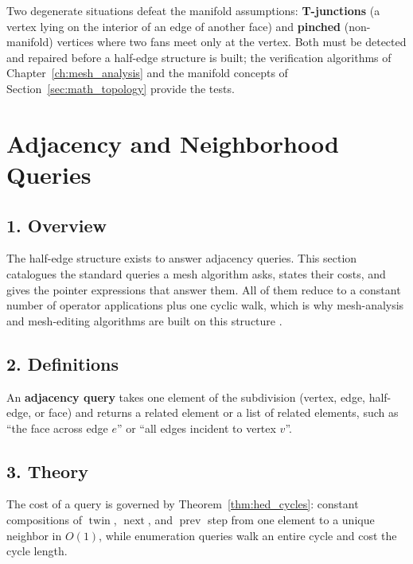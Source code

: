 \begin{remark}
Two degenerate situations defeat the manifold assumptions:
\textbf{T-junctions} (a vertex lying on the interior of
an edge of another face) and \textbf{pinched}
(non-manifold) vertices where two fans meet only at the vertex. Both must
be detected and repaired before a half-edge structure is built; the
verification algorithms of Chapter~\ref{ch:mesh_analysis} and the
manifold concepts of Section~\ref{sec:math_topology} provide the tests.
\end{remark}


\section{Adjacency and Neighborhood Queries}
\label{sec:halfedge_adjacency}

\subsection{1. Overview}

The half-edge structure exists to answer adjacency
queries. This section catalogues the standard queries a mesh algorithm
asks, states their costs, and gives the pointer expressions that answer
them. All of them reduce to a constant number of operator applications plus
one cyclic walk, which is why mesh-analysis and mesh-editing algorithms are
built on this structure \cite{deberg2008,botsch2010}.

\subsection{2. Definitions}

\begin{definition}\label{def:hed_adjacency_query}
An \textbf{adjacency query} takes one element of the subdivision (vertex,
edge, half-edge, or face) and returns a related element or a list of
related elements, such as ``the face across edge $e$'' or ``all edges
incident to vertex $v$''.
\end{definition}

\subsection{3. Theory}

The cost of a query is governed by Theorem~\ref{thm:hed_cycles}: constant
compositions of $\operatorname{twin}$, $\operatorname{next}$, and
$\operatorname{prev}$ step from one element to a unique neighbor in $O(1)$,
while enumeration queries walk an entire cycle and cost the cycle length.

